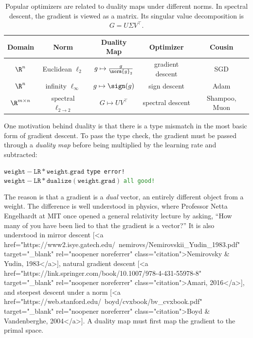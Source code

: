 \renewcommand{\arraystretch}{1.5}
\begin{table}[t]
    \centering
    \begin{tabular}{ccccc}
        \toprule
        \textbf{Domain} & \textbf{Norm} & \hspace{1.3em}\textbf{Duality Map} & \textbf{Optimizer} & \textbf{Cousin}\\
        \midrule
        $\R^n$ & Euclidean $\ell_2$ & $\displaystyle g \mapsto  \tfrac{g}{\norm{g}_2}$ & gradient descent & SGD \\
        
        $\R^n$ & infinity $\ell_\infty$ & $\displaystyle g \mapsto \sign(g)$ & sign descent & Adam \\
        
        $\R^{m\times n}$ & spectral $\ell_{2\to2}$ & $\displaystyle G \mapsto UV^\top$ & spectral descent & Shampoo, Muon \\
        \bottomrule
    \end{tabular}
    \caption{Popular optimizers are related to duality maps under different norms. In spectral descent, the gradient is viewed as a matrix. Its singular value decomposition is $G = U \Sigma V^\top$.}
    \label{tab:weight_update_rules}
\end{table}
\renewcommand{\arraystretch}{1}

One motivation behind duality is that there is a type mismatch in the most basic form of gradient descent. To pass the type check, the gradient must be passed through a \textit{duality map} before being multiplied by the learning rate and subtracted:

\begin{center}
    \begin{minipage}{0.6\textwidth}
    $\mathtt{weight} - \mathtt{LR}\,\mathtt{*}\,\mathtt{weight.grad}$ \hfill \texttt{\textcolor{BrickRed}{type error!}} \\
    $\mathtt{weight} - \mathtt{LR}\,\mathtt{*}\,\mathtt{dualize}(\mathtt{weight.grad})$ \hfill \texttt{\textcolor{ForestGreen}{all good!}}
    \end{minipage}
\end{center}

The reason is that a gradient is a \textit{dual} vector, an entirely different object from a weight. The difference is well understood in physics, where Professor Netta Engelhardt at MIT once opened a general relativity lecture by asking, “How many of you have been lied to that the gradient is a vector?” It is also understood in mirror descent [<a href="https://www2.isye.gatech.edu/~nemirovs/Nemirovskii_Yudin_1983.pdf" target="_blank" rel="noopener noreferrer" class="citation">Nemirovsky & Yudin, 1983</a>], natural gradient descent [<a href="https://link.springer.com/book/10.1007/978-4-431-55978-8" target="_blank" rel="noopener noreferrer" class="citation">Amari, 2016</a>], and steepest descent under a norm [<a href="https://web.stanford.edu/~boyd/cvxbook/bv_cvxbook.pdf" target="_blank" rel="noopener noreferrer" class="citation">Boyd & Vandenberghe, 2004</a>]. A duality map must first map the gradient to the primal space.

